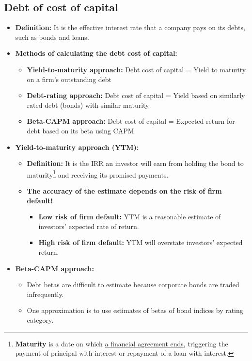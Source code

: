 \documentclass[ieeetran]{article}
\begin{document}
\subsection{Debt of cost of capital} %
\label{sub:debt_of_cost_of_capital}
\begin{itemize}
  \item \textbf{Definition:} It is the effective interest rate that a company pays on its debts, such as bonds and loans.

\item \textbf{Methods of calculating the debt cost of capital:}
	\begin{itemize}
	  \item \textbf{Yield-to-maturity approach:} Debt cost of capital = Yield to maturity on a firm's outstanding debt
	\item \textbf{Debt-rating approach:} Debt cost of capital = Yield based on similarly rated debt (bonds) with similar maturity
	\item \textbf{Beta-CAPM approach:} Debt cost of capital = Expected return for debt based on its beta using CAPM
	\end{itemize}

\item \textbf{Yield-to-maturity approach (YTM):}
	\begin{itemize}
		\item \textbf{Definition:} It is the IRR an investor will earn from holding the bond to maturity\footnote{\textbf{Maturity} is a date on which \underline{a financial agreement ends}, triggering the payment of principal with interest or repayment of a loan with interest.} and receiving its promised payments.

	        \item \textbf{The accuracy of the estimate depends on the risk of firm default!}
			\begin{itemize}
				\item \textbf{Low risk of firm default:} YTM is a reasonable estimate of investors' expected rate of return.
				\item \textbf{High risk of firm default:} YTM will overstate investors' expected return.
			\end{itemize}
	\end{itemize}

\item \textbf{Beta-CAPM approach:}
	\begin{itemize}
		\item Debt betas are difficult to estimate because corporate bonds are traded infrequently.
	\item One approximation is to use estimates of betas of bond indices by rating category.
	\end{itemize}
\end{itemize}
\end{document}
